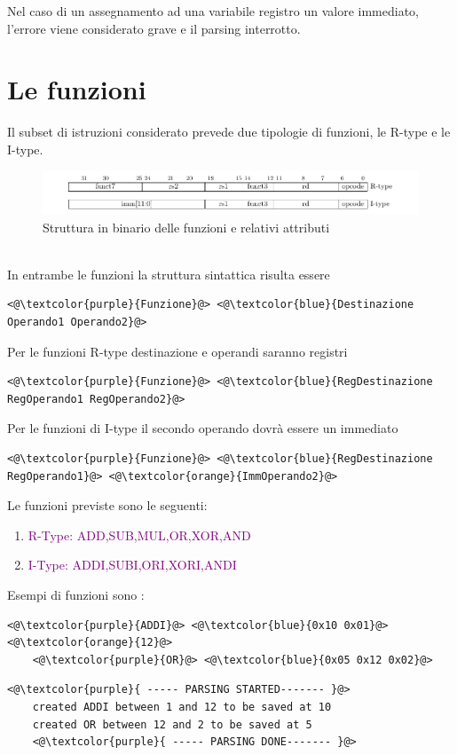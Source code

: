 Nel caso di un assegnamento ad una variabile registro un valore immediato, l'errore viene considerato grave e il parsing interrotto.



\newpage
\section{Le funzioni}
Il subset di istruzioni considerato prevede due tipologie di funzioni, le R-type e le I-type.
\begin{figure}[h]
    \centering
    \includegraphics[scale=0.5]{functionTypes.png}
    \caption{Struttura in binario delle funzioni e relativi attributi}
    \label{fig:err1}
\end{figure}
\\
In entrambe le funzioni la struttura sintattica risulta essere
\begin{lstlisting}[numbers=none]
    <@\textcolor{purple}{Funzione}@> <@\textcolor{blue}{Destinazione Operando1 Operando2}@>
\end{lstlisting}
Per le funzioni R-type destinazione e operandi saranno registri
\begin{lstlisting}[numbers=none]
    <@\textcolor{purple}{Funzione}@> <@\textcolor{blue}{RegDestinazione RegOperando1 RegOperando2}@>
\end{lstlisting}
Per le funzioni di I-type il secondo operando dovrà essere un immediato
\begin{lstlisting}[numbers=none]
    <@\textcolor{purple}{Funzione}@> <@\textcolor{blue}{RegDestinazione RegOperando1}@> <@\textcolor{orange}{ImmOperando2}@>
\end{lstlisting}

Le funzioni previste sono le seguenti: 
\begin{enumerate}
    \item \textcolor{purple}{R-Type: ADD,SUB,MUL,OR,XOR,AND}
    \item \textcolor{purple}{I-Type: ADDI,SUBI,ORI,XORI,ANDI}
\end{enumerate}
Esempi di funzioni sono :
\begin{lstlisting}[caption=input]
    <@\textcolor{purple}{ADDI}@> <@\textcolor{blue}{0x10 0x01}@> <@\textcolor{orange}{12}@>
    <@\textcolor{purple}{OR}@> <@\textcolor{blue}{0x05 0x12 0x02}@>
\end{lstlisting}
\begin{lstlisting}[caption=output]
    <@\textcolor{purple}{ ----- PARSING STARTED------- }@>
    created ADDI between 1 and 12 to be saved at 10
    created OR between 12 and 2 to be saved at 5
    <@\textcolor{purple}{ ----- PARSING DONE------- }@>
\end{lstlisting}
